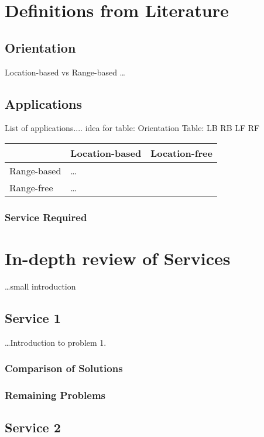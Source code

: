 \documentclass[a4paper]{article}
\begin{document}
\section{Definitions from Literature}

  \subsection{Orientation}
  Location-based vs Range-based \ldots
  \subsection{Applications}
  List of applications.... idea for table: Orientation Table: LB RB LF RF\\
  
  \begin{tabular}{|p{3cm}|p{3cm}|p{3cm}|}
    \hline
     & Location-based & Location-free\\\hline
    Range-based & \ldots & \\\hline
    Range-free & \ldots & \\
    \hline
  \end{tabular}
  
  \subsubsection{Service Required}

\section{In-depth review of Services}
    \ldots small introduction
    \subsection{Service 1}

      \ldots Introduction to problem 1.

      \subsubsection{Comparison of Solutions}
      \subsubsection{Remaining Problems}

    \subsection{Service 2}
\end{document}
